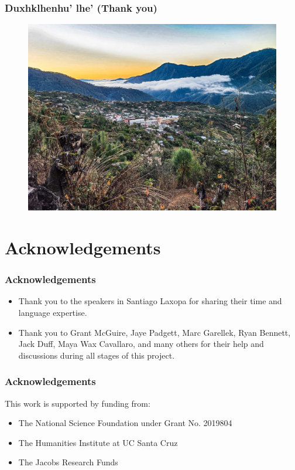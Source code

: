 \documentclass{beamer}
\begin{document}
\begin{frame}
  \frametitle{Duxhklhenhu' lhe' (Thank you)}
  \begin{figure}[h!]
    \centering
    \includegraphics[width = \linewidth]{images/SantiagoLaxopa.jpeg}
  \end{figure}
\end{frame}

\section*{Acknowledgements}

\begin{frame}
  \frametitle{Acknowledgements}
  \begin{itemize}
    \item Thank you to the speakers in Santiago Laxopa for sharing their time and language expertise. 
    \item Thank you to Grant McGuire, Jaye Padgett, Marc Garellek, Ryan Bennett, Jack Duff, Maya Wax Cavallaro, and many others for their help and discussions during all stages of this project. 
  \end{itemize}
\end{frame}

\begin{frame}
  \frametitle{Acknowledgements}
  This work is supported by funding from: 
  \begin{itemize}
    \item The National Science Foundation under Grant No. 2019804
    \item The Humanities Institute at UC Santa Cruz 
    \item The Jacobs Research Funds
  \end{itemize}

\end{frame}
\end{document}
